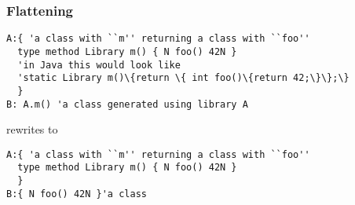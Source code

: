 


\begin{frame}[fragile]
\frametitle{Flattening}
\begin{NiceCode}{59ex}{1}
\begin{lstlisting}
A:{ 'a class with ``m'' returning a class with ``foo''
  type method Library m() { N foo() 42N }
  'in Java this would look like 
  'static Library m()\{return \{ int foo()\{return 42;\}\};\}
  }
B: A.m() 'a class generated using library A
\end{lstlisting}
\end{NiceCode}
rewrites to 

\begin{NiceCode}{59ex}{1}
\begin{lstlisting}
A:{ 'a class with ``m'' returning a class with ``foo''
  type method Library m() { N foo() 42N }
  }
B:{ N foo() 42N }'a class 
\end{lstlisting}
\end{NiceCode}
\end{frame}


